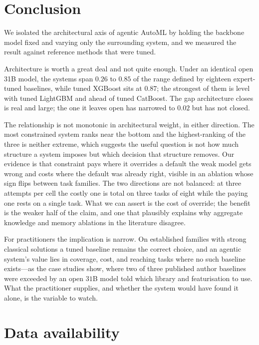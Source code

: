 \section{Conclusion}
\label{sec:conclusion}

We isolated the architectural axis of agentic AutoML by holding the backbone
model fixed and varying only the surrounding system, and we measured the result
against reference methods that were tuned.

Architecture is worth a great deal and not quite enough. Under an identical open
31B model, the systems span $0.26$ to $0.85$ of the range defined by eighteen
expert-tuned baselines, while tuned XGBoost sits at $0.87$; the strongest of
them is level with tuned LightGBM and ahead of tuned CatBoost.
The gap architecture closes is real and large; the one it leaves open has
narrowed to $0.02$ but has not closed.

The relationship is not monotonic in architectural weight, in either direction.
The most constrained system ranks near the bottom and the highest-ranking of the
three is neither extreme, which suggests the useful question is not how much
structure a system imposes but which decision that structure removes. Our
evidence is that constraint pays where it overrides a default the weak model gets
wrong and costs where the default was already right, visible in an ablation whose
sign flips between task families. The two directions are not balanced: at three
attempts per cell the costly one is total on three tasks of eight while the
paying one rests on a single task. What we can assert is the cost of override;
the benefit is the weaker half of the claim, and one that plausibly explains why
aggregate knowledge and memory ablations in the literature disagree.

For practitioners the implication is narrow. On established families with strong
classical solutions a tuned baseline remains the correct choice, and an agentic
system's value lies in coverage, cost, and reaching tasks where no such baseline
exists---as the case studies show, where two of three published author baselines
were exceeded by an open $31$B model told which library and featurisation to use.
What the practitioner supplies, and whether the system would have found it alone,
is the variable to watch.

\section*{Data availability}

